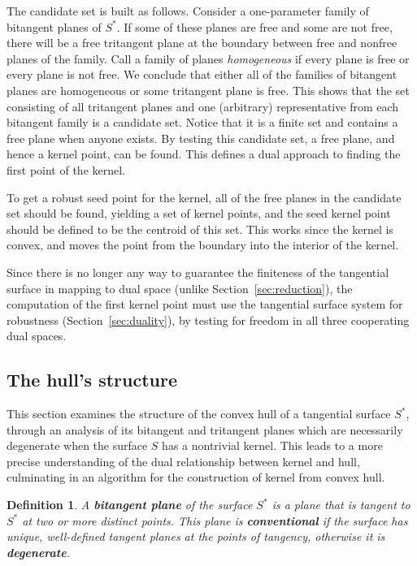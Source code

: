 \documentclass[12pt]{article}
\newtheorem{defn2}[theorem]{Definition}
\begin{document}
The candidate set is built as follows.
Consider a one-parameter family of bitangent planes of $S^*$.
If some of these planes are free and some are not free,
there will be a free tritangent plane at the boundary
between free and nonfree planes of the family.
Call a family of planes {\em homogeneous} if every plane is
free or every plane is not free.
We conclude that either all of the families of bitangent planes
are homogeneous or some tritangent plane is free.
This shows that the set consisting of all tritangent planes
and one (arbitrary) representative from each bitangent family
is a candidate set.
Notice that it is a finite set and contains a free plane when anyone exists.
By testing this candidate set, a free plane, and hence a kernel point, can be found.
This defines a dual approach to finding the first point of the kernel.

To get a robust seed point for the kernel,
all of the free planes in the candidate set should be found,
yielding a set of kernel points, and the seed kernel point 
should be defined to be the centroid of this set.
This works since the kernel is convex, and moves the point from the boundary
into the interior of the kernel.

Since there is no longer any way to guarantee the finiteness of the tangential surface
in mapping to dual space (unlike Section~\ref{sec:reduction}),
the computation of the first kernel point must use the tangential surface system 
for robustness (Section~\ref{sec:duality}),
by testing for freedom in all three cooperating dual spaces.


\subsection{The hull's structure}
\label{sec:cusp}

This section examines the structure of the convex hull of a tangential
surface $S^*$, through an analysis of its bitangent and tritangent planes
which are necessarily degenerate when the surface $S$ has a nontrivial kernel.
This leads to a more precise understanding of the 
dual relationship between kernel and hull, culminating in an
algorithm for the construction of kernel from convex hull.

\begin{defn2}
A {\bf bitangent plane} of the surface $S^*$ is a plane that
is tangent to $S^*$ at two or more distinct points.
This plane is {\bf conventional} if the surface has unique, well-defined 
tangent planes at the points of tangency,
otherwise it is {\bf degenerate}.
\end{defn2}
\end{document}

